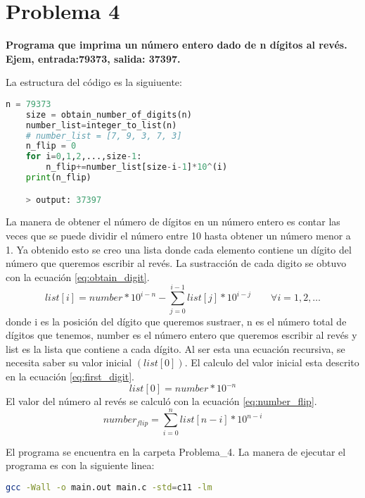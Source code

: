 \section*{Problema 4}
\textbf{Programa que imprima un número entero dado de n dígitos al revés. Ejem, entrada:79373, salida: 37397.}

La estructura del código es la siguiuente:
\begin{lstlisting}[language=python]
    n = 79373
    size = obtain_number_of_digits(n)
    number_list=integer_to_list(n)
    # number_list = [7, 9, 3, 7, 3]
    n_flip = 0
    for i=0,1,2,...,size-1:
        n_flip+=number_list[size-i-1]*10^(i)
    print(n_flip)

    > output: 37397
\end{lstlisting}

La manera de obtener el número de dígitos en un número entero es contar las veces que se puede dividir el número entre 10 hasta obtener un número menor a 1. Ya obtenido esto se creo una lista donde cada elemento contiene un dígito del número que queremos escribir al revés. La sustracción de cada digito se obtuvo con la ecuación \ref{eq:obtain_digit}.
\begin{equation}
    list[i]=number*10^{i-n}- \sum_{j=0}^{i-1} list[j] * 10^{i-j} \qquad \forall i=1,2,\dots
    \label{eq:obtain_digit}
\end{equation}
donde  i es la posición del dígito que queremos sustraer, n es el número total de dígitos que tenemos, number es el número entero que queremos escribir al revés y list es la lista que contiene a cada dígito. Al ser esta una ecuación recursiva, se necesita saber su valor inicial $(list[0])$. El calculo del valor inicial esta descrito en la ecuación \ref{eq:first_digit}.
\begin{equation}
    list[0] = number *10^{-n}
    \label{eq:first_digit}
\end{equation}
El valor del número al revés se calculó con la ecuación \ref{eq:number_flip}.
\begin{equation}
    number_{flip} = \sum_{i=0}^{n} list[n-i]*10^{n-i}
    \label{eq:number_flip}
\end{equation}

El programa se encuentra en la carpeta \textcolor{citecolor}{Problema\_4}. La manera de ejecutar el programa es con la siguiente linea:
\begin{lstlisting}[language=bash]
    gcc -Wall -o main.out main.c -std=c11 -lm
\end{lstlisting}